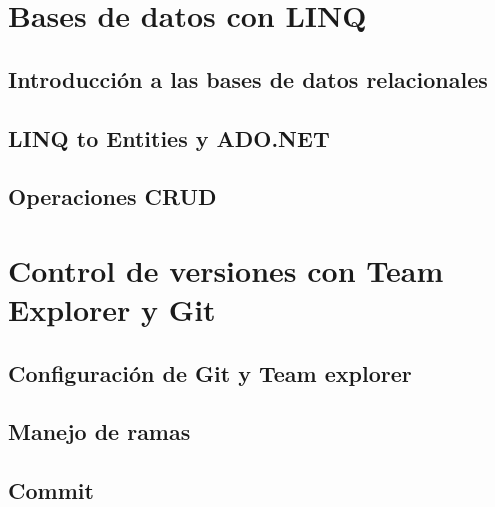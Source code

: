 \documentclass[12pt,a4paper]{report}
\begin{document}
\chapter{Bases de datos con LINQ}
\section{Introducción a las bases de datos relacionales}
\section{LINQ to Entities y ADO.NET}
\section{Operaciones CRUD}

\chapter{Control de versiones con Team Explorer y Git}
\section{Configuración de Git y Team explorer}
\section{Manejo de ramas}
\section{Commit}
\end{document}
